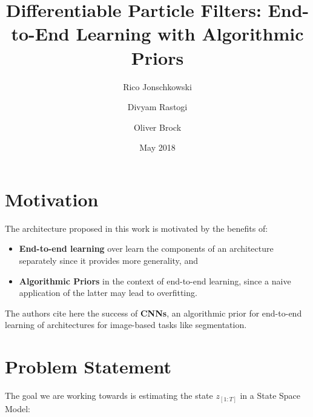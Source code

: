 \documentclass[10pt,twocolumn,letterpaper]{article}
\begin{document}
	
	\title{Differentiable Particle Filters: End-to-End Learning with Algorithmic Priors}
	\author{Rico Jonschkowski \and Divyam Rastogi\and Oliver Brock}
	\date{May 2018}
	
	\maketitle

	\section{Motivation}
	The architecture proposed in this work is motivated by the benefits of:
	\begin{itemize}
		\item \textbf{End-to-end learning} over learn the components of an architecture separately since it provides more generality, and
		\item \textbf{Algorithmic Priors} in the context of end-to-end learning, since a naive application of the latter may lead to overfitting.
	\end{itemize}
	The authors cite here the success of \textbf{CNNs}, an algorithmic prior for end-to-end learning of architectures for image-based tasks like segmentation.
	
	\section{Problem Statement}
	
	The goal we are working towards is estimating the state $z_[1:T]$ in a State Space Model: 
	
\end{document}
